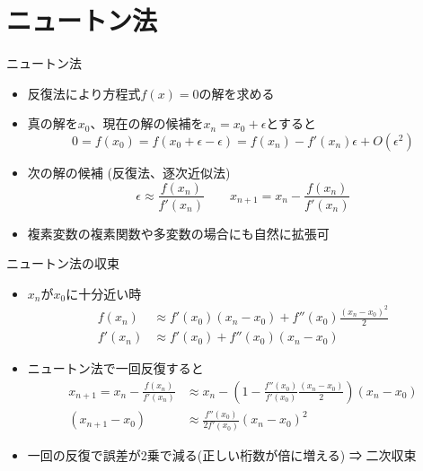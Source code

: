 \section{ニュートン法}

\begin{frame}[t,fragile]{ニュートン法}
  \begin{itemize}
    \setlength{\itemsep}{1em}
  \item 反復法により方程式$f(x)=0$の解を求める
  \item 真の解を$x_0$、現在の解の候補を$x_n=x_0+\epsilon$とすると
    \[
    0 = f(x_0) = f(x_0+\epsilon-\epsilon) = f(x_n) - f'(x_n) \epsilon + O(\epsilon^2)
    \]
  \item 次の解の候補 (反復法、逐次近似法)
    \[
    \epsilon \approx \frac{f(x_n)}{f'(x_n)} \quad\quad x_{n+1} = x_n - \frac{f(x_n)}{f'(x_n)}
    \]
  \item 複素変数の複素関数や多変数の場合にも自然に拡張可
  \end{itemize}
\end{frame}

\begin{frame}[t,fragile]{ニュートン法の収束}
  \begin{itemize}
    \setlength{\itemsep}{1em}
  \item $x_n$が$x_0$に十分近い時
    \begin{align*}
      f(x_n) &\approx f'(x_0) (x_n-x_0) + f''(x_0) \frac{(x_n - x_0)^2}{2} \\
      f'(x_n) &\approx f'(x_0) + f''(x_0) (x_n - x_0)
    \end{align*}
  \item ニュートン法で一回反復すると
    \begin{align*}
      x_{n+1} =  x_n - \frac{f(x_n)}{f'(x_n)} &\approx x_n - (1-\frac{f''(x_0)}{f'(x_0)}\frac{(x_n-x_0)}{2})(x_n-x_0) \\
      (x_{n+1}-x_0) &\approx \frac{f''(x_0)}{2f'(x_0)} (x_n - x_0)^2
    \end{align*}
    \item 一回の反復で誤差が2乗で減る(正しい桁数が倍に増える) ⇒ 二次収束
  \end{itemize}
\end{frame}

